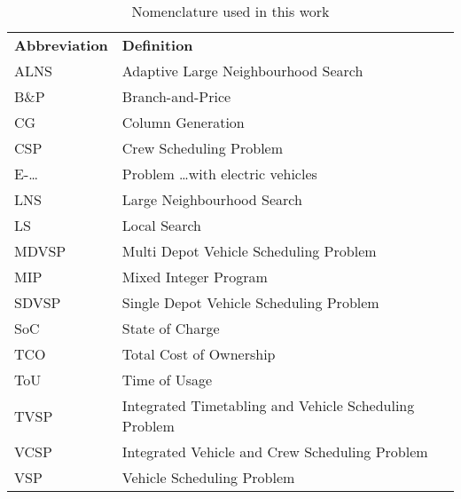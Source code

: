 \documentclass[ht]{article}
\begin{document}
\begin{table}[h]
  \centering
  \begin{tabular}{ll}
    \toprule
    \multicolumn{1}{l}{\textbf{Abbreviation}} & \multicolumn{1}{l}{\textbf{Definition}} \\ 
    \cmidrule(lr){1-1}\cmidrule(lr){2-2}
    ALNS & Adaptive Large Neighbourhood Search \\
    B\&P & Branch-and-Price \\
    CG & Column Generation \\
    CSP & Crew Scheduling Problem \\
    E-\dots & Problem \dots with electric vehicles \\
    LNS & Large Neighbourhood Search \\ 
    LS & Local Search \\
    MDVSP & Multi Depot Vehicle Scheduling Problem \\
    MIP & Mixed Integer Program \\ 
    SDVSP & Single Depot Vehicle Scheduling Problem \\ 
    SoC & State of Charge \\
    TCO & Total Cost of Ownership \\
    ToU & Time of Usage \\
    TVSP & Integrated Timetabling and Vehicle Scheduling Problem \\
    VCSP & Integrated Vehicle and Crew Scheduling Problem \\
    VSP & Vehicle Scheduling Problem \\
    \bottomrule
  \end{tabular}
  \caption{Nomenclature used in this work}
\end{table}
\end{document}
